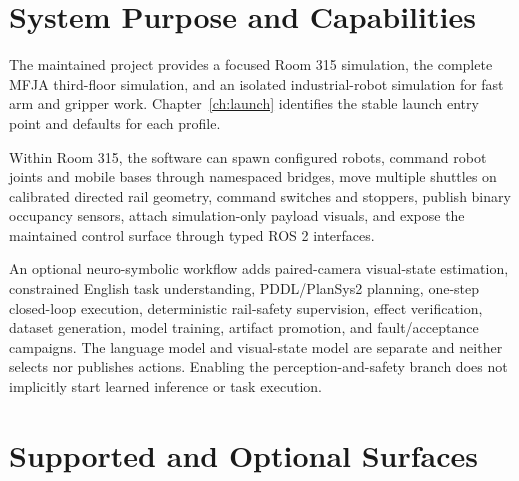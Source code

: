 \section{System Purpose and Capabilities}

The maintained project provides a focused Room 315 simulation, the complete
MFJA third-floor simulation, and an isolated industrial-robot simulation for
fast arm and gripper work. Chapter~\ref{ch:launch} identifies the stable launch
entry point and defaults for each profile.

Within Room 315, the software can spawn configured robots, command robot joints
and mobile bases through namespaced bridges, move multiple shuttles on
calibrated directed rail geometry, command switches and stoppers, publish
binary occupancy sensors, attach simulation-only payload visuals, and expose
the maintained control surface through typed ROS 2 interfaces.

An optional neuro-symbolic workflow adds paired-camera visual-state estimation,
constrained English task understanding, PDDL/PlanSys2 planning, one-step
closed-loop execution, deterministic rail-safety supervision, effect
verification, dataset generation, model training, artifact promotion, and
fault/acceptance campaigns. The language model and visual-state model are
separate and neither selects nor publishes actions. Enabling the
perception-and-safety branch does not implicitly start learned inference or task
execution.

\section{Supported and Optional Surfaces}

